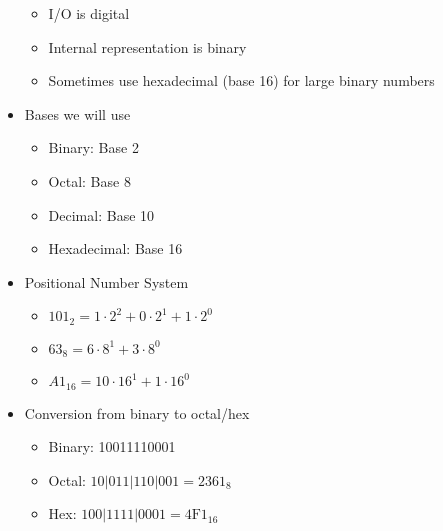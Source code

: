 \begin{itemize}
    \begin{itemize}

      \item I/O is digital

      \item Internal representation is binary

      \item Sometimes use hexadecimal (base 16) for large binary numbers

    \end{itemize}

  \item Bases we will use

    \begin{itemize}

      \item Binary: Base 2

      \item Octal: Base 8

      \item Decimal: Base 10

      \item Hexadecimal: Base 16

    \end{itemize}

  \item Positional Number System

    \begin{itemize}

      \item $101_2=1\cdot2^2 + 0\cdot2^1 + 1\cdot2^0$

      \item $63_8=6\cdot 8^1 + 3\cdot8^0$

      \item $A1_{16}=10\cdot16^1 + 1\cdot16^0$

    \end{itemize}

  \item Conversion from binary to octal/hex

    \begin{itemize}

      \item Binary: 10011110001

        \item Octal: $10 | 011 | 110 | 001 = 2361_8$

        \item Hex: $100 | 1111 | 0001 = 4\text{F}1_{16}$


\end{itemize}
\end{itemize}
